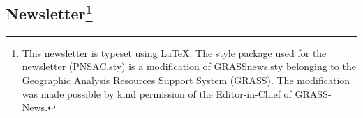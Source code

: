 \columnbreak  

\address{Roger Button\\
Director, Corporate Secretary, NStar Chronicle Editor}\\

\address{Paul Labranche\\
Treasurer\\
}

  
\subsection{Newsletter\protect\footnote{This newsletter is typeset using
    \LaTeX.  The style package used for the newsletter (PNSAC.sty) is
    a modification of GRASSnews.sty belonging to the Geographic
    Analysis Resources Support System (GRASS). The modification was
    made possible by kind permission of the Editor-in-Chief of
    GRASS-News.}}


\small\address{Editor: Roger Button\\
\small{}}

\address{Typesetter: Drew Hodge}







